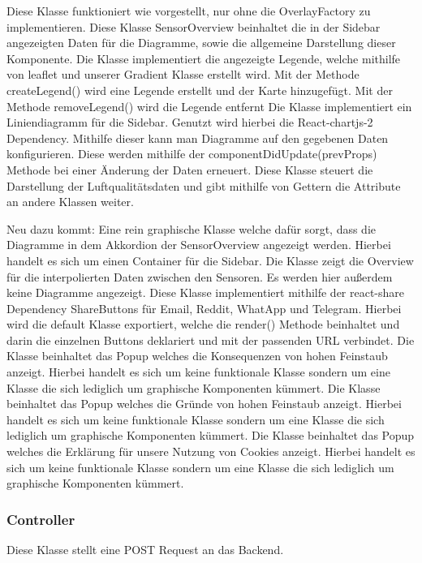     Diese Klasse funktioniert wie vorgestellt, nur ohne die OverlayFactory zu implementieren.
    Diese Klasse SensorOverview beinhaltet die in der Sidebar angezeigten Daten für die Diagramme, sowie die allgemeine Darstellung dieser Komponente.
    Die Klasse implementiert die angezeigte Legende, welche mithilfe von leaflet und unserer Gradient Klasse erstellt wird.
    Mit der Methode createLegend() wird eine Legende erstellt und der Karte hinzugefügt.
    Mit der Methode removeLegend() wird die Legende entfernt
    Die Klasse implementiert ein Liniendiagramm für die Sidebar. Genutzt wird hierbei die React-chartjs-2 Dependency.
    Mithilfe dieser kann man Diagramme auf den gegebenen Daten konfigurieren. Diese werden mithilfe der componentDidUpdate(prevProps) Methode
    bei einer Änderung der Daten erneuert.
    \removedClass
{}
    \removedClass
{}
    Diese Klasse steuert die Darstellung der Luftqualitätsdaten und gibt mithilfe von Gettern die Attribute an andere Klassen weiter.

Neu dazu kommt:
    Eine rein graphische Klasse welche dafür sorgt, dass die Diagramme in dem Akkordion der SensorOverview angezeigt werden.
    Hierbei handelt es sich um einen Container für die Sidebar.
    Die Klasse zeigt die Overview für die interpolierten Daten zwischen den Sensoren. Es werden hier außerdem keine Diagramme angezeigt.
    Diese Klasse implementiert mithilfe der react-share Dependency ShareButtons für Email, Reddit, WhatApp und Telegram.
    Hierbei wird die default Klasse exportiert, welche die render() Methode beinhaltet und darin die einzelnen Buttons deklariert und 
    mit der passenden URL verbindet.
    Die Klasse beinhaltet das Popup welches die Konsequenzen von hohen Feinstaub anzeigt. Hierbei handelt es sich um keine funktionale Klasse sondern um eine Klasse die sich
    lediglich um graphische Komponenten kümmert.
    Die Klasse beinhaltet das Popup welches die Gründe von hohen Feinstaub anzeigt. Hierbei handelt es sich um keine funktionale Klasse sondern um eine Klasse die sich
    lediglich um graphische Komponenten kümmert.
    Die Klasse beinhaltet das Popup welches die Erklärung für unsere Nutzung von Cookies anzeigt. Hierbei handelt es sich um keine funktionale Klasse sondern um eine Klasse die sich
    lediglich um graphische Komponenten kümmert.

    \subsubsection{Controller}
    Diese Klasse stellt eine POST Request an das Backend.